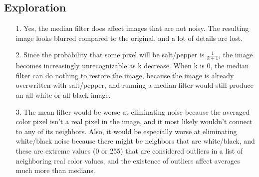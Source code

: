 \documentclass[fontsize=11pt]{article}
\begin{document}
    \subsection*{Exploration}

    \begin{enumerate}
        \item[1.] Yes, the median filter does affect images that are not noisy. The resulting image looks blurred compared to the original, and a lot of details are lost.
        \item[2.] Since the probability that some pixel will be salt/pepper is $\frac{1}{k+1}$, the image becomes increasingly unrecognizable as k decrease. When k is 0, the median filter can do nothing to restore the image, because the image is already overwritten with salt/pepper, and running a median filter would still produce an all-white or all-black image.
        \item[3.] The mean filter would be worse at eliminating noise because the averaged color pixel isn't a real pixel in the image, and it most likely wouldn't connect to any of its neighbors. Also, it would be especially worse at eliminating white/black noise because there might be neighbors that are white/black, and these are extreme values (0 or 255) that are considered outliers in a list of neighboring real color values, and the existence of outliers affect averages much more than medians.
    \end{enumerate}
\end{document}

